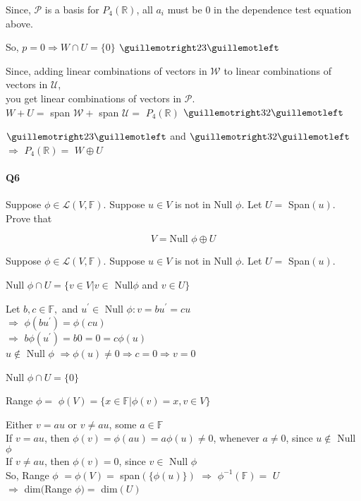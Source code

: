 \documentclass{article}
\begin{document}
Since, $\mathcal{P}$ is a basis for $P_4(\mathbb{R})$, all $a_i$ must
be $0$ in the dependence test equation above.

So, $p=0 \Rightarrow W \cap U = \{0\}$ $\guillemotright 23 \guillemotleft$

Since, adding linear combinations of vectors
in $\mathcal{W}$ to linear combinations of vectors in $\mathcal{U}$,\\
you get linear combinations of vectors in $\mathcal{P}$.\\
$W + U =$ span $\mathcal{W} +$  span $\mathcal{U} =$ $P_4(\mathbb{R})$ $\guillemotright 32 \guillemotleft$


$\guillemotright 23 \guillemotleft$ and $\guillemotright 32
\guillemotleft$ $\Rightarrow$ $P_4(\mathbb{R}) =$  $W \oplus U$

\newpage
\paragraph{Q6} Suppose $\phi ∈ \mathcal{L}(V, \mathbb{F})$. Suppose $u
∈ V$ is not in Null $\phi$. Let
$U =$ Span$(u)$. Prove that

\[V = \text{Null } \phi \oplus U\]

\vspace{0.618 em}

Suppose $\phi ∈ \mathcal{L}(V, \mathbb{F})$. Suppose $u
∈ V$ is not in Null $\phi$. Let
$U =$ Span$(u)$.

Null $\phi \cap U = \{v \in V| v \in$ Null$\phi$ and $v \in U\}$

Let $b,c \in \mathbb{F},$ and $u^\prime \in$ Null $\phi: v= bu^\prime= cu$\\
$\Rightarrow$ $\phi(bu^\prime)= \phi(cu)$\\
$\Rightarrow$ $b\phi(u^\prime) = b0 = 0 = c\phi(u)$\\
$u \notin$ Null $\phi$ $\Rightarrow \phi(u) \neq 0 \Rightarrow c = 0
\Rightarrow v = 0$

Null $\phi \cap U = \{0\}$

Range $\phi =$ $\phi(V) = \{x \in \mathbb{F}| \phi(v) = x, v \in V\}$

Either $v = au$ or $v \neq au$, some $a \in \mathbb{F}$\\
If $v=au$, then $\phi(v)=\phi(au) = a\phi(u) \neq 0$, whenever $a \neq 0$, since $u \notin$ Null
$\phi$\\
If $v \neq au$, then $\phi(v) = 0$, since $v \in$ Null $\phi$\\
So, Range $\phi$ $= \phi(V) =$ span$(\{\phi(u)\})$ $\Rightarrow$
$\phi^{-1}(\mathbb{F}) =$ $U$\\
$\Rightarrow$ dim$($Range $\phi) =$ dim$(U)$
\end{document}
